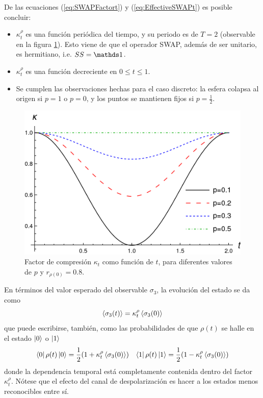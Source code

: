 De las ecuaciones (\ref{eq:SWAPFactort}) y (\ref{eq:EffectiveSWAPt}) es posible concluir:
\begin{itemize}
  \item $\kappa_{t}^{\rho}$ es una función periódica del tiempo, y su periodo es de $T=2$ (observable en la figura \ref{fig:SWAPFactor2Dt}). Esto viene de que el operador SWAP, además de ser unitario, es hermitiano, i.e. $SS=\Id$.
  \item $\kappa_{t}^{\rho}$ es una función decreciente en $0\leq t\leq 1$.
  \item Se cumplen las observaciones hechas para el caso discreto: la esfera colapsa al origen si $p=1$ o $p=0$, y los puntos se mantienen fijos si $p=\frac{1}{2}$.
\end{itemize}

\begin{figure}[ht!]
  \centering
  \includegraphics[width=0.6\linewidth]{chapter3/figures_toy/ContractionFactorSWAP_z=0.8_t=0_to_t=2.png}
  \caption{Factor de compresión $\kappa_{t}$ como función de $t$, para diferentes valores de $p$ y $r_{\rho(0)}=0.8$.}
  \label{fig:SWAPFactor2Dt}
\end{figure}

En términos del valor esperado del observable $\sigma_{3}$, la evolución del estado se da como
\begin{equation}
  \expval{\sigma_{3}(t)}=\kappa_{t}^{\rho}\expval{\sigma_{3}(0)}
\end{equation}
que puede escribirse, también, como las probabilidades de que $\rho(t)$ se halle en el estado $\ket{0}$ o $\ket{1}$
 \begin{align}
  \bra{0}\rho(t)\ket{0}=\frac{1}{2}(1+\kappa_{t}^{\rho}\expval{\sigma_{3}(0)}) && \bra{1}\rho(t)\ket{1}=\frac{1}{2}(1-\kappa_{t}^{\rho}\expval{\sigma_{3}(0)})
 \end{align}
 donde la dependencia temporal está completamente contenida dentro del factor $\kappa_{t}^{\rho}$. Nótese que el efecto del canal de despolarización es hacer a los estados menos reconocibles entre sí.


